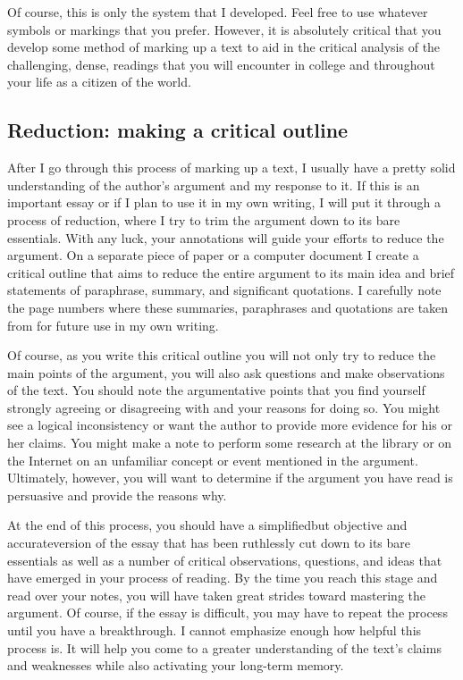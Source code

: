 Of course, this is only the system that I developed. Feel free to use whatever symbols or markings that you prefer. However, it is absolutely critical that you develop some method of marking up a text to aid in the critical analysis of the challenging, dense, readings that you will encounter in college and throughout your life as a citizen of the world.

\subsection{Reduction: making a critical outline}

After I go through this process of marking up a text, I usually have a pretty solid understanding of the author's argument and my response to it. If this is an important essay or if I plan to use it in my own writing, I will put it through a process of reduction, where I try to trim the argument down to its bare essentials. With any luck, your annotations will guide your efforts to reduce the argument. On a separate piece of paper or a computer document I create a critical outline that aims to reduce the entire argument to its main idea and brief statements of paraphrase, summary, and significant quotations. I carefully note the page numbers where these summaries, paraphrases and quotations are taken from for future use in my own writing.

Of course, as you write this critical outline you will not only try to reduce the main points of the argument, you will also ask questions and make observations of the text. You should note the argumentative points that you find yourself strongly agreeing or disagreeing with and your reasons for doing so. You might see a logical inconsistency or want the author to provide more evidence for his or her claims. You might make a note to perform some research at the library or on the Internet on an unfamiliar concept or event mentioned in the argument. Ultimately, however, you will want to determine if the argument you have read is persuasive and provide the reasons why.

At the end of this process, you should have a simplified\textemdash but objective and accurate\textemdash version of the essay that has been ruthlessly cut down to its bare essentials as well as a number of critical observations, questions, and ideas that have emerged in your process of reading. By the time you reach this stage and read over your notes, you will have taken great strides toward mastering the argument. Of course, if the essay is difficult, you may have to repeat the process until you have a breakthrough. I cannot emphasize enough how helpful this process is. It will help you come to a greater understanding of the text’s claims and weaknesses while also activating your long-term memory.

